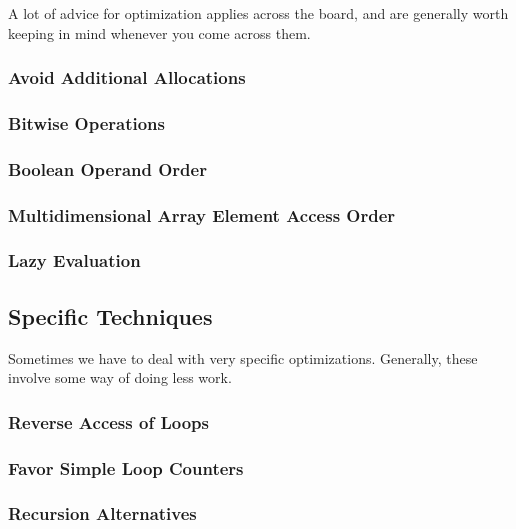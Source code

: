 A lot of advice for optimization applies across the board, and are generally worth keeping in mind whenever you come across them.

\subsubsection{Avoid Additional Allocations}

\subsubsection{Bitwise Operations}

\subsubsection{Boolean Operand Order}

\subsubsection{Multidimensional Array Element Access Order}

\subsubsection{Lazy Evaluation}

\subsection{Specific Techniques}

Sometimes we have to deal with very specific optimizations. Generally, these involve some way of doing less work.

\subsubsection{Reverse Access of Loops}

\subsubsection{Favor Simple Loop Counters}

\subsubsection{Recursion Alternatives}

